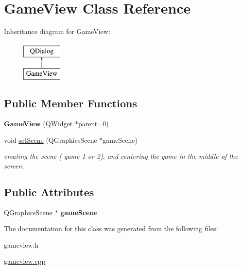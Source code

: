 \hypertarget{classGameView}{\section{Game\-View Class Reference}
\label{classGameView}
}
Inheritance diagram for Game\-View\-:\begin{figure}[H]
\begin{center}
\leavevmode
\includegraphics[height=2.000000cm]{classGameView}
\end{center}
\end{figure}
\subsection*{Public Member Functions}
\begin{DoxyCompactItemize}
\item 
\hypertarget{classGameView_a6f41d09f51d2abd6abb3b99e5da8ef6f}{{\bfseries Game\-View} (Q\-Widget $\ast$parent=0)}\label{classGameView_a6f41d09f51d2abd6abb3b99e5da8ef6f}

\item 
\hypertarget{classGameView_a99555fe40cf367386272760cfd5ffd82}{void \hyperlink{classGameView_a99555fe40cf367386272760cfd5ffd82}{set\-Scene} (Q\-Graphics\-Scene $\ast$game\-Scene)}\label{classGameView_a99555fe40cf367386272760cfd5ffd82}

\begin{DoxyCompactList}\small\item\em creating the scene ( game 1 or 2), and centering the game in the middle of the screen. \end{DoxyCompactList}\end{DoxyCompactItemize}
\subsection*{Public Attributes}
\begin{DoxyCompactItemize}
\item 
\hypertarget{classGameView_a268225b0de88730c884f0deffc85059a}{Q\-Graphics\-Scene $\ast$ {\bfseries game\-Scene}}\label{classGameView_a268225b0de88730c884f0deffc85059a}

\end{DoxyCompactItemize}


The documentation for this class was generated from the following files\-:\begin{DoxyCompactItemize}
\item 
gameview.\-h\item 
\hyperlink{gameview_8cpp}{gameview.\-cpp}\end{DoxyCompactItemize}
